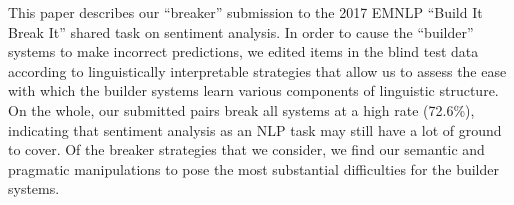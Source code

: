 This paper describes our ``breaker'' submission to the 2017 EMNLP ``Build It Break It'' shared task on sentiment analysis. In order to cause the ``builder'' systems to make incorrect predictions, we edited items in the blind test data according to linguistically interpretable strategies that allow us to assess the ease with which the builder systems learn various components of linguistic structure. On the whole, our submitted pairs break all systems at a high rate (72.6\%), indicating that sentiment analysis as an NLP task may still have a lot of ground to cover. Of the breaker strategies that we consider, we find our semantic and pragmatic manipulations to pose the most substantial difficulties for the builder systems.
